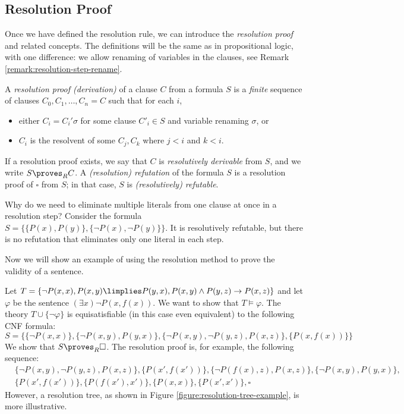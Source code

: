 \subsection{Resolution Proof}

Once we have defined the resolution rule, we can introduce the \emph{resolution proof} and related concepts. The definitions will be the same as in propositional logic, with one difference: we allow renaming of variables in the clauses, see Remark \ref{remark:resolution-step-rename}.

\begin{definition}
    A \emph{resolution proof (derivation)} of a clause $C$ from a formula $S$ is a \emph{finite} sequence of clauses $C_0,C_1,\dots,C_n=C$
    such that for each $i$,
    \begin{itemize}
        \item either $C_i=C_i'\sigma$ for some clause $C'_i\in S$ and variable renaming $\sigma$, or
        \item $C_i$ is the resolvent of some $C_j,C_k$ where $j<i$ and $k<i$.
    \end{itemize}
    If a resolution proof exists, we say that $C$ is \emph{resolutively derivable} from $S$, and we write $S\proves_R C$. A \emph{(resolution) refutation} of the formula $S$ is a resolution proof of $\square$ from $S$; in that case, $S$ is \emph{(resolutively) refutable}.
\end{definition}

\begin{remark}
    Why do we need to eliminate multiple literals from one clause at once in a resolution step? Consider the formula $S=\{\{P(x),P(y)\},\{\neg P(x),\neg P(y)\}\}$. It is resolutively refutable, but there is no refutation that eliminates only one literal in each step.
\end{remark}

Now we will show an example of using the resolution method to prove the validity of a sentence.

\begin{example}\label{example:resolution-proof-predicate}
Let $T=\{\neg P(x,x),P(x,y) \limplies P(y,x), P(x,y)\land P(y,z)\to P(x,z)\}$ and let $\varphi$ be the sentence $(\exists x)\neg P(x,f(x))$. We want to show that $T\models\varphi$. The theory $T\cup\{\neg\varphi\}$ is equisatisfiable (in this case even equivalent) to the following CNF formula:
$$S=\{\{\neg P(x,x)\},\{\neg P(x,y),P(y,x)\},\{\neg P(x,y),\neg P(y,z), P(x,z)\},\{P(x,f(x))\}\}$$
We show that $S\proves_R\square$. The resolution proof is, for example, the following sequence:
\begin{align*}
    &\{\neg P(x,y),\neg P(y,z), P(x,z)\},
    \{P(x',f(x'))\},
    \{\neg P(f(x),z),P(x,z)\},
    \{\neg P(x,y),P(y,x)\},\\
    &\{P(x',f(x'))\},
    \{P(f(x'),x')\},
    \{P(x,x)\},
    \{P(x',x')\},
    \square   
\end{align*}
However, a resolution tree, as shown in Figure \ref{figure:resolution-tree-example}, is more illustrative.
\end{example}

